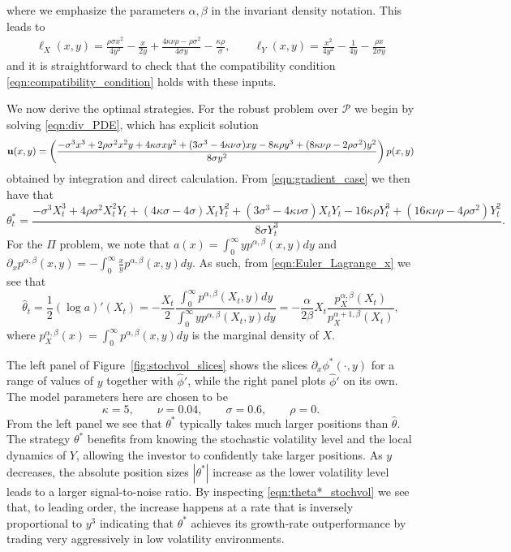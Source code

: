 \documentclass{article}
\theoremstyle{plain}
\theoremstyle{definition}
\newcommand{\Pcal}{{\mathcal P}}
\numberwithin{lem}{section}
\begin{document}
     where we emphasize the parameters $\alpha,\beta$ in the invariant density notation.
This leads to 
\begin{align}
    \ell_X(x,y)  =  \frac{\rho\sigma x^2}{4y^2} - \frac{x}{2y} + \frac{4\kappa \nu \rho - \rho \sigma^2}{4\sigma y} - \frac{\kappa \rho}{\sigma}, \qquad \ell_Y(x,y) = \frac{x^2}{4y^2} - \frac{1}{4y} - \frac{\rho x}{2\sigma y}
\end{align}
and it is straightforward to check that the compatibility condition \eqref{eqn:compatibility_condition} holds with these inputs. 

We now derive the optimal strategies. For the robust problem over $\Pcal$ we begin by solving \eqref{eqn:div_PDE}, which has explicit solution
\[{\bf u}(x,y) = \left(\frac{-\sigma ^3 x^3+2 \rho  \sigma ^2 x^2 y+4 \kappa  \sigma  xy^2+(3 \sigma ^3-4 \kappa  \nu  \sigma)xy-8 \kappa  \rho  y^3+ (8 \kappa  \nu  \rho -2 \rho  \sigma ^2)y^2}{8 \sigma  y^2}\right)p(x,y)\]
obtained by integration and direct calculation. From \eqref{eqn:gradient_case} we then have that 
\begin{equation} \label{eqn:theta*_stochvol}
    \theta^*_t = \frac{-\sigma ^3 X_t^3+4 \rho  \sigma ^2 X_t^2 Y_t+(4 \kappa  \sigma -4 \sigma )X_tY_t^2+(3 \sigma ^3-4 \kappa  \nu 
   \sigma)X_tY_t -16 \kappa  \rho  Y_t^3+ (16 \kappa  \nu  \rho -4 \rho  \sigma ^2)Y_t^2}{8\sigma Y_t^3}.
\end{equation}
   For the $\Pi$ problem, we note that $a(x) = \int_0^\infty yp^{\alpha,\beta}(x,y)dy$ and $\partial_x p^{\alpha,\beta}(x,y) = -\int_0^\infty \frac{x}{y}p^{\alpha,\beta}(x,y)dy$. As such, from \eqref{eqn:Euler_Lagrange_x} we see that
   \[\widehat \theta_t = \frac{1}{2}(\log a)'(X_t) = -\frac{X_t}{2}\frac{\int_0^\infty p^{\alpha,\beta}(X_t,y)dy}{\int_0^\infty yp^{\alpha,\beta}(X_t,y)dy} = - \frac{\alpha}{2\beta} X_t\frac{p_X^{\alpha,\beta}(X_t)}{p_X^{\alpha+1,\beta}(X_t)},\]
   where $p_X^{\alpha,\beta}(x) = \int_0^\infty p^{\alpha,\beta}(x,y)dy$ is the marginal density of $X$. 

   The left panel of Figure~\ref{fig:stochvol_slices} shows the slices $\partial_x \phi^*(\cdot,y)$ for a range of values of $y$ together with $\widehat \phi'$, while the right panel plots $\widehat \phi'$ on its own. The model parameters here are chosen to be
   \[\kappa = 5, \qquad \nu = 0.04, \qquad \sigma = 0.6, \qquad \rho = 0.\] 
From the left panel we see that $\theta^*$ typically takes much larger positions than $\widehat \theta$. The strategy $\theta^*$ benefits from knowing the stochastic volatility level and the local dynamics of $Y$, allowing the investor to confidently take larger positions. As $y$ decreases, the absolute position sizes $|\theta^*|$ increase as the lower volatility level leads to a larger signal-to-noise ratio. By inspecting \eqref{eqn:theta*_stochvol} we see that, to leading order, the increase happens at a rate that is inversely proportional to $y^3$ indicating that $\theta^*$ achieves its growth-rate outperformance by trading very aggressively in low volatility environments.
\end{document}
